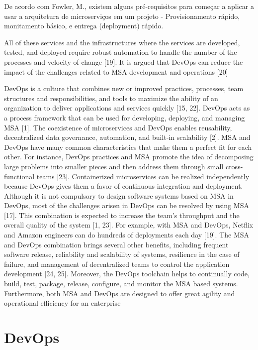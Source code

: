 De acordo com Fowler, M., existem alguns pré-requisitos para começar a aplicar a usar a arquitetura de microserviços em um projeto - Provisionamento rápido, monitamento básico, e entrega (deployment) rápido.



All of these services and the infrastructures where the services are developed, tested, and deployed require robust automation to handle the number of the processes and velocity of change [19]. It is argued that DevOps can reduce the impact of the challenges related to MSA development and operations [20]

DevOps is a culture that combines new or improved practices, processes, team structures and responsibilities, and tools to maximize the ability of an organization to deliver applications and services quickly [15, 22]. DevOps acts as a process framework that can be used for developing, deploying, and managing MSA [1]. The coexistence of microservices and DevOps enables reusability, decentralized data governance, automation, and built-in scalability [2]. MSA and DevOps have many common characteristics that make them a perfect fit for each other. For instance, DevOps practices and MSA promote the idea of decomposing large problems into smaller pieces and then address them through small cross-functional teams [23]. Containerized microservices can be realized independently because DevOps gives them a favor of continuous integration and deployment. Although it is not compulsory to design software systems based on MSA in DevOps, most of the challenges arisen in DevOps can be resolved by using MSA [17]. This combination is expected to increase the team’s throughput and the overall quality of the system [1, 23]. For example, with MSA and DevOps, Netflix and Amazon engineers can do hundreds of deployments each day [19]. The MSA and DevOps combination brings several other benefits, including frequent software release, reliability and scalability of systems, resilience in the case of failure, and management of decentralized teams to control the application development [24, 25]. Moreover, the DevOps toolchain helps to continually code, build, test, package, release, configure, and monitor the MSA based systems. Furthermore, both MSA and DevOps are designed to offer great agility and operational efficiency for an enterprise
\section{DevOps}
\label{devops}

